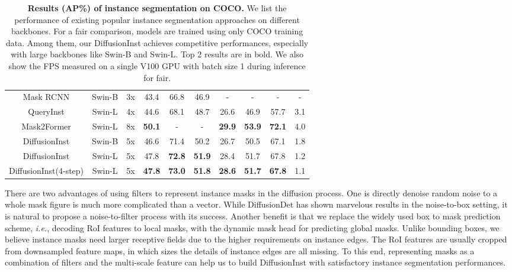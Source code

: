 \documentclass{article}
\begin{document}
\begin{table*}[thb]
\begin{tabular}{c|c|c|c|cc|ccc|c}
Mask RCNN &  Swin-B & 3x & 43.4  & 66.8  & {46.9}  & -  & -  & - &-\\
QueryInst & Swin-L &4x &44.6& 68.1& 48.7& 26.6 &46.9 &57.7 &3.1\\ 
  Mask2Former & Swin-L &8x &\textbf{50.1}&-&-& \textbf{29.9}& \textbf{53.9} &\textbf{72.1} &4.0\\
DiffusionInst &  Swin-B &5x & 46.6&{71.4}&{50.2}&26.7&50.5&67.1& 1.8 \\
DiffusionInst &  Swin-L &5x &47.8&\textbf{72.8}&\textbf{51.9}&28.4&51.7&67.8&  1.2 \\
  DiffusionInst(4-step) &  Swin-L &5x& \textbf{47.8}&\textbf{73.0}&\textbf{51.8}&\textbf{28.6}&\textbf{51.7}&\textbf{67.8}&1.1 \\
 \bottomrule
 \end{tabular}\caption{\textbf{Results (AP\%) of instance segmentation on COCO.} We list the performance of existing popular instance segmentation approaches on different backbones. For a fair comparison, models are trained using only COCO training data. Among them, our DiffusionInst achieves competitive performances, especially with large backbones like Swin-B and Swin-L. Top 2 results are in bold. We also show the FPS measured on a single V100 GPU with batch size 1 during inference for fair.}
\label{sota}
\end{table*}

There are two advantages of using filters to represent instance masks in the diffusion process. One is directly denoise random noise to a whole mask figure is much more complicated than a vector. While DiffusionDet has shown marvelous results in the noise-to-box setting, it is natural to propose a noise-to-filter process with its success. Another benefit is that we replace the widely used box to mask prediction scheme, \emph{i.e.}, decoding RoI features to local masks, with the dynamic mask head for predicting global masks. Unlike bounding boxes, we believe instance masks need larger receptive fields due to the higher requirements on instance edges. The RoI features are usually cropped from downsampled feature maps, in which sizes the details of instance edges are all missing. To this end, representing masks as a combination of filters and the multi-scale feature can help us to build DiffusionInst with satisfactory instance segmentation performances. 
\end{document}
